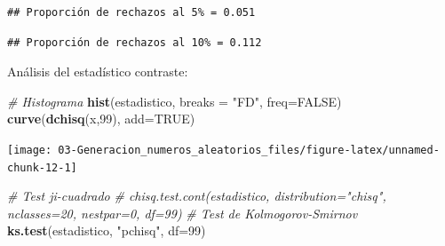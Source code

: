 \documentclass[
]{book}
\newenvironment{Shaded}{\begin{snugshade}}{\end{snugshade}}
\newcommand{\CharTok}[1]{\textcolor[rgb]{0.31,0.60,0.02}{#1}}
\newcommand{\CommentTok}[1]{\textcolor[rgb]{0.56,0.35,0.01}{\textit{#1}}}
\newcommand{\DataTypeTok}[1]{\textcolor[rgb]{0.13,0.29,0.53}{#1}}
\newcommand{\DecValTok}[1]{\textcolor[rgb]{0.00,0.00,0.81}{#1}}
\newcommand{\FloatTok}[1]{\textcolor[rgb]{0.00,0.00,0.81}{#1}}
\newcommand{\KeywordTok}[1]{\textcolor[rgb]{0.13,0.29,0.53}{\textbf{#1}}}
\newcommand{\NormalTok}[1]{#1}
\newcommand{\OperatorTok}[1]{\textcolor[rgb]{0.81,0.36,0.00}{\textbf{#1}}}
\newcommand{\OtherTok}[1]{\textcolor[rgb]{0.56,0.35,0.01}{#1}}
\newcommand{\StringTok}[1]{\textcolor[rgb]{0.31,0.60,0.02}{#1}}
\theoremstyle{break}
\theoremstyle{definition}
\theoremstyle{definition}
\theoremstyle{definition}
\theoremstyle{remark}
\begin{document}
\begin{Shaded}
\end{Shaded}

\begin{verbatim}
## Proporción de rechazos al 5% = 0.051
\end{verbatim}

\begin{Shaded}
\end{Shaded}

\begin{verbatim}
## Proporción de rechazos al 10% = 0.112
\end{verbatim}

Análisis del estadístico contraste:

\begin{Shaded}
\begin{Highlighting}[]
\CommentTok{# Histograma}
\KeywordTok{hist}\NormalTok{(estadistico, }\DataTypeTok{breaks =} \StringTok{"FD"}\NormalTok{, }\DataTypeTok{freq=}\OtherTok{FALSE}\NormalTok{)}
\KeywordTok{curve}\NormalTok{(}\KeywordTok{dchisq}\NormalTok{(x,}\DecValTok{99}\NormalTok{), }\DataTypeTok{add=}\OtherTok{TRUE}\NormalTok{)}
\end{Highlighting}
\end{Shaded}

\begin{center}\texttt{[image: 03-Generacion\_numeros\_aleatorios\_files/figure-latex/unnamed-chunk-12-1]} \end{center}

\begin{Shaded}
\begin{Highlighting}[]
\CommentTok{# Test ji-cuadrado}
\CommentTok{# chisq.test.cont(estadistico, distribution="chisq", nclasses=20, nestpar=0, df=99)}
\CommentTok{# Test de Kolmogorov-Smirnov}
\KeywordTok{ks.test}\NormalTok{(estadistico, }\StringTok{"pchisq"}\NormalTok{, }\DataTypeTok{df=}\DecValTok{99}\NormalTok{)}
\end{Highlighting}
\end{Shaded}
\end{document}
